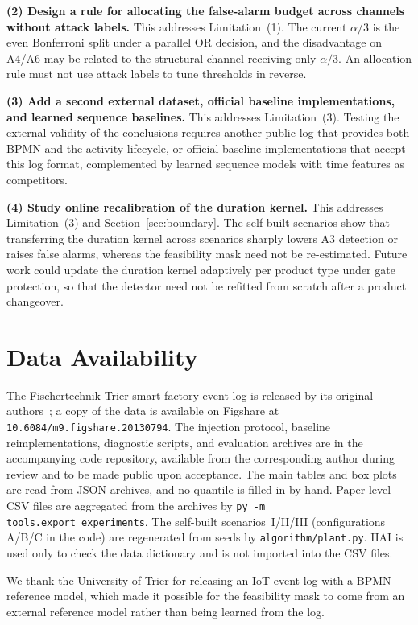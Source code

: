 \documentclass[manuscript,screen,review]{acmart}
\begin{document}
\textbf{(2) Design a rule for allocating the false-alarm budget across channels without attack labels.}
This addresses Limitation~(1). The current $\alpha/3$ is the even Bonferroni split under a parallel OR decision, and the disadvantage on {A4}/{A6} may be related to the structural channel receiving only $\alpha/3$. An allocation rule must not use attack labels to tune thresholds in reverse.

\textbf{(3) Add a second external dataset, official baseline implementations, and learned sequence baselines.}
This addresses Limitation~(3). Testing the external validity of the conclusions requires another public log that provides both {BPMN} and the activity lifecycle, or official baseline implementations that accept this log format, complemented by learned sequence models with time features as competitors.

\textbf{(4) Study online recalibration of the duration kernel.}
This addresses Limitation~(3) and Section~\ref{sec:boundary}. The self-built scenarios show that transferring the duration kernel across scenarios sharply lowers {A3} detection or raises false alarms, whereas the feasibility mask need not be re-estimated. Future work could update the duration kernel adaptively per product type under gate protection, so that the detector need not be refitted from scratch after a product changeover.

\section{Data Availability}
\label{sec:data}

The {Fischertechnik} {Trier} smart-factory event log is released by its original authors~\cite{malburg2022trier}; a copy of the data is available on {Figshare} at \texttt{10.6084/m9.figshare.20130794}. The injection protocol, baseline reimplementations, diagnostic scripts, and evaluation archives are in the accompanying code repository, available from the corresponding author during review and to be made public upon acceptance. The main tables and box plots are read from JSON archives, and no quantile is filled in by hand. Paper-level {CSV} files are aggregated from the archives by \texttt{py -m tools.export\_experiments}. The self-built scenarios~I/II/III (configurations {A}/{B}/{C} in the code) are regenerated from seeds by \texttt{algorithm/plant.py}. {HAI} is used only to check the data dictionary and is not imported into the {CSV} files.

\begin{acks}
We thank the {University of Trier} for releasing an {IoT} event log with a {BPMN} reference model, which made it possible for the feasibility mask to come from an external reference model rather than being learned from the log.
\end{acks}



\end{document}
